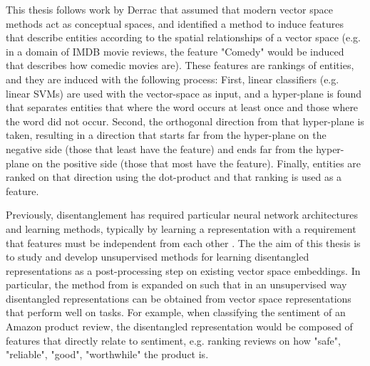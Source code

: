 

This thesis follows work by Derrac \cite{Derrac2015} that  assumed that modern vector space methods act as conceptual spaces, and  identified a method to induce features that describe entities according to the spatial relationships of a vector space  (e.g. in a domain of IMDB movie reviews, the feature "Comedy" would be  induced that describes how comedic movies are).  These features are rankings of entities, and they are induced with the following process: First, linear classifiers (e.g. linear SVMs) are used with the vector-space as input, and a hyper-plane is found that separates entities that where the word occurs at least once and those where the word did not occur. Second, the orthogonal direction from that hyper-plane is taken, resulting in a direction that starts  far from the hyper-plane on the negative side (those that least have the feature) and ends far from the hyper-plane on the positive side (those that most have the feature). Finally, entities are ranked on that direction using the dot-product and that ranking is used as a feature. %

Previously, disentanglement has required particular  neural network architectures and learning methods, typically by learning a representation with a requirement that features must be independent from each other \cite{Banner}  \cite{Paige2016}. The  the aim of this thesis is to study and develop unsupervised methods for learning disentangled representations as a post-processing step on existing vector space embeddings. In particular, the method from \cite{Derrac2015} is expanded on such that in an unsupervised way disentangled representations can be obtained from vector space representations that perform well on tasks. For example, when classifying the sentiment of an Amazon product review, the disentangled representation would be composed of features that directly relate to sentiment, e.g. ranking reviews on how "safe", "reliable", "good", "worthwhile" the product is. 


